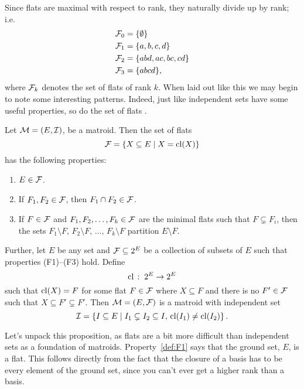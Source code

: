 \documentclass[12pt,oneside]{../../sfsuthesis}
\begin{document}
Since flats are maximal with respect to rank, they naturally divide up by rank; i.e.
\begin{align*}
    \mathcal{F}_0 & = \{ \emptyset \}       \\
    \mathcal{F}_1 & = \{ a, b, c, d \}      \\
    \mathcal{F}_2 & = \{ abd, ac, bc, cd \} \\
    \mathcal{F}_3 & = \{ abcd\},            \\
\end{align*}
where \( \mathcal{F}_k \) denotes the set of flats of rank \( k \).
When laid out like this we may begin to note some interesting patterns.
Indeed, just like independent sets have some useful properties, so do the set of flats \cite[pp.~31-32]{oxleyMatroidTheory2011}.

\begin{proposition}\th\label{prop:matroidFlatAxioms}
    Let \( \mathcal{M} = (E, \mathcal{I}) \), be a matroid.
    Then the set of flats
    \[
        \mathcal{F} = \{ X \subseteq E \; | \; X = \operatorname{cl}(X) \}
    \]
    has the following properties:
    \begin{enumerate}[label=(F\arabic*)]
        \item \( E \in \mathcal{F} \).\label{def:F1}
        \item If \(F_1, F_2 \in \mathcal{F}\), then \( F_1 \cap F_2 \in \mathcal{F} \).\label{def:F2}
        \item If \( F \in \mathcal{F} \) and \(F_1, F_2, \dots , F_k \in \mathcal{F} \) are the minimal flats such that \( F \subsetneq F_i \),
              then the sets \( F_1 \setminus F,\, F_2 \setminus F,\, \dots,\, F_k \setminus F \) partition \( E \setminus F \).\label{def:F3}
    \end{enumerate}
    Further, let \( E \) be any set and \( \mathcal{F} \subseteq 2^{E} \) be a collection of subsets of \( E \) such that properties (F1)--(F3) hold.
    Define
    \[
        \operatorname{cl} \, : \; 2^E \to 2^E
    \]
    such that \( \operatorname{cl}(X) = F \) for some flat \( F \in \mathcal{F} \) where \( X \subseteq F \) and there is no \( F' \in \mathcal{F} \) such that \( X \subseteq F' \subsetneq F' \).
    Then \( \mathcal{M} = (E, \mathcal{F}) \) is a matroid with independent set
    \[
        \mathcal{I} = \left\{ I \subseteq E \; \middle| \; I_1 \subsetneq I_2 \subseteq I, \, \operatorname{cl}(I_1) \neq \operatorname{cl}(I_2)\right\}.
    \]


\end{proposition}

Let's unpack this proposition, as flats are a bit more difficult than independent sets as a foundation of matroids.
Property~\ref{def:F1} says that the ground set, \( E \), is a flat.
This follows directly from the fact that the closure of a basis has to be every element of the ground set, since you can't ever get a higher rank than a basis.
\end{document}
